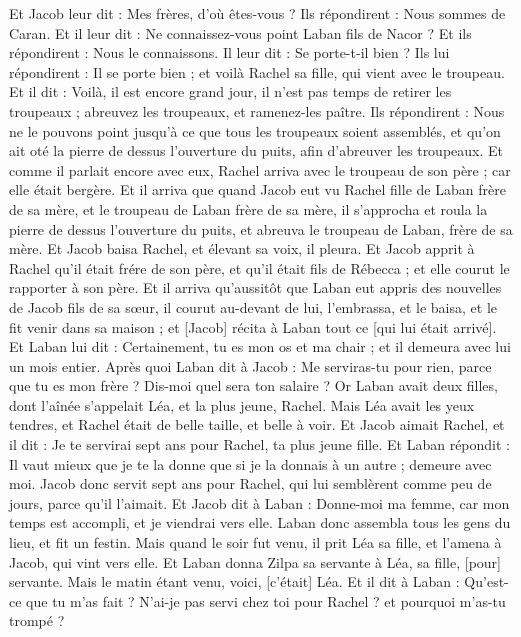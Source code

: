 \begin{multicols}{2}
Et Jacob leur dit : Mes frères, d'où êtes-vous ? Ils répondirent : Nous sommes de Caran.
Et il leur dit : Ne connaissez-vous point Laban fils de Nacor ? Et ils répondirent : Nous le connaissons.
Il leur dit : Se porte-t-il bien ? Ils lui répondirent : Il se porte bien ; et voilà Rachel sa fille, qui vient avec le troupeau.
Et il dit : Voilà, il est encore grand jour, il n'est pas temps de retirer les troupeaux ; abreuvez les troupeaux, et ramenez-les paître.
Ils répondirent : Nous ne le pouvons point jusqu'à ce que tous les troupeaux soient assemblés, et qu'on ait oté la pierre de dessus l'ouverture du puits, afin d'abreuver les troupeaux.
Et comme il parlait encore avec eux, Rachel arriva avec le troupeau de son père ; car elle était bergère.
Et il arriva que quand Jacob eut vu Rachel fille de Laban frère de sa mère, et le troupeau de Laban frère de sa mère, il s'approcha et roula la pierre de dessus l'ouverture du puits, et abreuva le troupeau de Laban, frère de sa mère.
Et Jacob baisa Rachel, et élevant sa voix, il pleura.
Et Jacob apprit à Rachel qu'il était frére de son père, et qu'il était fils de Rébecca ; et elle courut le rapporter à son père.
Et il arriva qu'aussitôt que Laban eut appris des nouvelles de Jacob fils de sa sœur, il courut au-devant de lui, l'embrassa, et le baisa, et le fit venir dans sa maison ; et [Jacob] récita à Laban tout ce [qui lui était arrivé].
Et Laban lui dit : Certainement, tu es mon os et ma chair ; et il demeura avec lui un mois entier.
Après quoi Laban dit à Jacob : Me serviras-tu pour rien, parce que tu es mon frère ? Dis-moi quel sera ton salaire ?
Or Laban avait deux filles, dont l'aînée s'appelait Léa, et la plus jeune, Rachel.
Mais Léa avait les yeux tendres, et Rachel était de belle taille, et belle à voir.
Et Jacob aimait Rachel, et il dit : Je te servirai sept ans pour Rachel, ta plus jeune fille.
Et Laban répondit : Il vaut mieux que je te la donne que si je la donnais à un autre ; demeure avec moi.
Jacob donc servit sept ans pour Rachel, qui lui semblèrent comme peu de jours, parce qu'il l'aimait.
Et Jacob dit à Laban : Donne-moi ma femme, car mon temps est accompli, et je viendrai vers elle.
Laban donc assembla tous les gens du lieu, et fit un festin.
Mais quand le soir fut venu, il prit Léa sa fille, et l'amena à Jacob, qui vint vers elle.
Et Laban donna Zilpa sa servante à Léa, sa fille, [pour] servante.
Mais le matin étant venu, voici, [c'était] Léa. Et il dit à Laban : Qu'est-ce que tu m'as fait ? N'ai-je pas servi chez toi pour Rachel ? et pourquoi m'as-tu trompé ?

\end{multicols}
